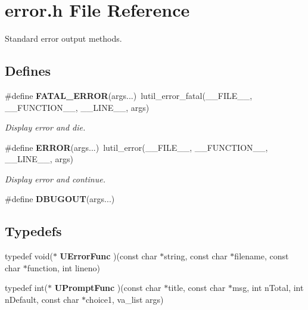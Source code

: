 \section{error.h File Reference}
\label{error_8h}
Standard error output methods.  


\subsection*{Defines}
\begin{CompactItemize}
\item 
\#define {\bf FATAL\_\-ERROR}(args...)\ lutil\_\-error\_\-fatal(\_\-\_\-FILE\_\-\_\-, \_\-\_\-FUNCTION\_\-\_\-, \_\-\_\-LINE\_\-\_\-, args)
\begin{CompactList}\small\item\em Display error and die. \item\end{CompactList}\item 
\#define {\bf ERROR}(args...)\ lutil\_\-error(\_\-\_\-FILE\_\-\_\-, \_\-\_\-FUNCTION\_\-\_\-, \_\-\_\-LINE\_\-\_\-, args)
\begin{CompactList}\small\item\em Display error and continue. \item\end{CompactList}\item 
\#define {\bf DBUGOUT}(args...)
\end{CompactItemize}
\subsection*{Typedefs}
\begin{CompactItemize}
\item 
typedef void($\ast$ {\bf UError\-Func} )(const char $\ast$string, const char $\ast$filename, const char $\ast$function, int lineno)
\item 
typedef int($\ast$ {\bf UPrompt\-Func} )(const char $\ast$title, const char $\ast$msg, int n\-Total, int n\-Default, const char $\ast$choice1, va\_\-list args)
\end{CompactItemize}

